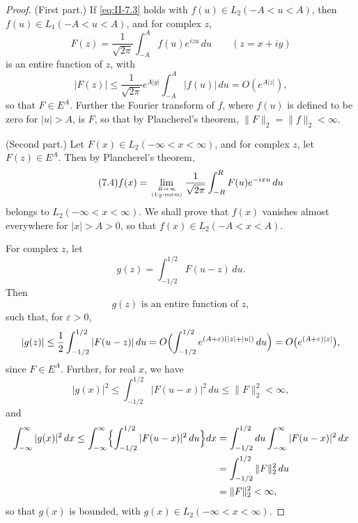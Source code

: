 \begin{proof}
(First part.) If \eqref{eq:II-7.3} holds with $f(u)\in L_{2}(-A<u<A)$, then $f(u)\in L_{1}(-A<u<A)$, and for complex $z$,
\[
F(z)=\frac{1}{\sqrt{2\pi}}\int_{-A}^{A}f(u)e^{izu}\,du\qquad(z=x+iy)
\]
is an entire function of $z$, with
\[
|F(z)|\le\frac{1}{\sqrt{2\pi}}e^{A|y|}\int_{-A}^{A}|f(u)|\,du=O(e^{A|z|}),
\]
so that $F\in E^{A}$. Further the Fourier transform of $f$, where $f(u)$ is defined to be zero for $|u|>A$, is $F$, so that by Plancherel's theorem, $\|F\|_{2}=\|f\|_{2}<\infty$.

(Second part.) Let $F(x)\in L_{2}(-\infty<x<\infty)$, and for complex $z$, let $F(z)\in E^{A}$. Then by Plancherel's theorem,
\begin{equation}\tag{7.4}\label{eq:II-7.4}
f(x)=\lim_{R\to\infty\atop(L_{2}\text{-norm})}\frac{1}{\sqrt{2\pi}}\int_{-R}^{R}F(u)e^{-ixu}\,du
\end{equation}
belongs to $L_{2}(-\infty<x<\infty)$. We shall prove that $f(x)$ vanishes almost everywhere for $|x|>A>0$, so that $f(x)\in L_{2}(-A<x<A)$.

For complex $z$, let
\begin{equation}\tag{7.5}\label{eq:II-7.5}
g(z)=\int_{-1/2}^{1/2}F(u-z)\,du.
\end{equation}
Then
\begin{equation}\tag{7.6}\label{eq:II-7.6}
g(z)\text{ is an entire function of }z,
\end{equation}
such that, for $\varepsilon>0$,
\[
|g(z)|\le\frac{1}{2}\int_{-1/2}^{1/2}|F(u-z)|\,du
=O\Bigl(\int_{-1/2}^{1/2}e^{(A+\varepsilon)(|z|+|u|)}\,du\Bigr)
=O\bigl(e^{(A+\varepsilon)|z|}\bigr),
\]
since $F\in E^{A}$. Further, for real $x$, we have
\begin{equation}\tag{7.7}\label{eq:II-7.7}
|g(x)|^{2}\le\int_{-1/2}^{1/2}|F(u-x)|^{2}\,du\le \|F\|_{2}^{2}<\infty,
\end{equation}
and
\[
\begin{aligned}
\int_{-\infty}^{\infty}|g(x)|^{2}\,dx
\le\int_{-\infty}^{\infty}\Bigl\{\int_{-1/2}^{1/2}|F(u-x)|^{2}\,du\Bigr\}dx &= \int_{-1/2}^{1/2}du\int_{-\infty}^{\infty}|F(u-x)|^{2}\,dx\\
&= \int_{-1/2}^{1/2}\|F\|_{2}^{2}\,du\\
&= \|F\|_{2}^{2}<\infty,
\end{aligned}
\]
so that $g(x)$ is bounded, with $g(x)\in L_{2}(-\infty<x<\infty)$.


\end{proof}

